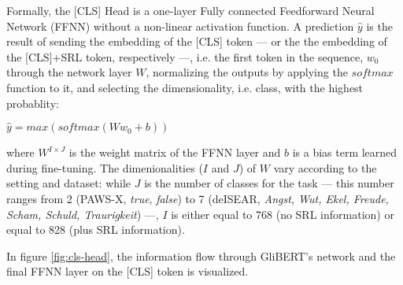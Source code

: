 
Formally, the [CLS] Head is a one-layer Fully connected Feedforward Neural Network (FFNN) without a
non-linear activation function. A prediction $\hat{y}$ is the result of sending the embedding
of the [CLS] token --- or the the embedding of the [CLS]+SRL token, respectively ---, i.e. the
first token in the sequence, $w_{0}$ through the network layer $W$, normalizing the outputs
by applying the $softmax$ function to it, and selecting the dimensionality, i.e. class, with the highest probablity:

$\hat{y} = max(softmax(Ww_{0}+b))$

where $W^{I\times J}$ is the weight matrix of the FFNN layer and $b$ is a bias term learned during
fine-tuning. The dimenionalities ($I$ and $J$) of $W$ vary according to the setting and dataset:
while $J$ is the number of classes for the task --- this number ranges from 2 (PAWS-X, \emph{true},
\emph{false}) to 7 (deISEAR, \emph{Angst, Wut, Ekel, Freude, Scham, Schuld, Traurigkeit}) ---, $I$
is either equal to 768 (no SRL information) or equal to 828 (plus SRL information).

In figure \ref{fig:cls-head}, the information flow through GliBERT's network and the final FFNN
layer on the [CLS] token is visualized.


